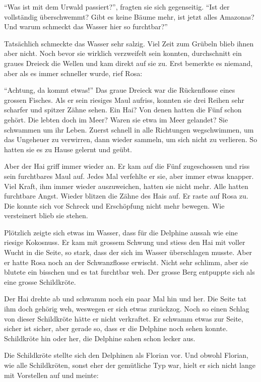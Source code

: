 \enquote{Was ist mit dem Urwald passiert?}, fragten sie sich gegenseitig. \enquote{Ist der vollständig überschwemmt? Gibt es keine Bäume mehr, ist jetzt alles Amazonas? Und warum schmeckt das Wasser hier so furchtbar?} 

Tatsächlich schmeckte das Wasser sehr salzig. Viel Zeit zum Grübeln blieb ihnen aber nicht. Noch bevor sie wirklich verzweifelt sein konnten, durchschnitt ein graues Dreieck die Wellen und kam direkt auf sie zu. Erst bemerkte es niemand, aber als es immer schneller wurde, rief Rosa:

\enquote{Achtung, da kommt etwas!} Das graue Dreieck war die Rückenflosse eines grossen Fisches. Als er sein riesiges Maul aufriss, konnten sie drei Reihen sehr scharfer und spitzer Zähne sehen. Ein Hai? Von denen hatten die Fünf schon gehört. Die lebten doch im Meer? Waren sie etwa im Meer gelandet? Sie schwammen um ihr Leben. Zuerst schnell in alle Richtungen wegschwimmen, um das Ungeheuer zu verwirren, dann wieder sammeln, um sich nicht zu verlieren. So hatten sie es zu Hause gelernt und geübt.

Aber der Hai griff immer wieder an. Er kam auf die Fünf zugeschossen und riss sein furchtbares Maul auf. Jedes Mal verfehlte er sie, aber immer etwas knapper. Viel Kraft, ihm immer wieder auszuweichen, hatten sie nicht mehr. Alle hatten furchtbare Angst. Wieder blitzen die Zähne des Hais auf. Er raste auf Rosa zu. Die konnte sich vor Schreck und Erschöpfung nicht mehr bewegen. Wie versteinert blieb sie stehen. 

Plötzlich zeigte sich etwas im Wasser, dass für die Delphine aussah wie eine riesige Kokosnuss. Er kam mit grossem Schwung und stiess den Hai mit voller Wucht in die Seite, so stark, dass der sich im Wasser überschlagen musste.  Aber er hatte Rosa noch an der Schwanzflosse erwischt. Nicht sehr schlimm, aber sie blutete ein bisschen und es tat furchtbar weh. Der grosse Berg entpuppte sich als eine grosse Schildkröte. 

Der Hai drehte ab und schwamm noch ein paar Mal hin und her. Die Seite tat ihm doch gehörig weh, weswegen er sich etwas zurückzog. Noch so einen Schlag von dieser Schildkröte hätte er nicht verkraftet. Er schwamm etwas zur Seite, sicher ist sicher, aber gerade so, dass er die Delphine noch sehen konnte. Schildkröte hin oder her, die Delphine sahen schon lecker aus.

Die Schildkröte stellte sich den Delphinen als Florian vor. Und obwohl Florian, wie alle Schildkröten, sonst eher der gemütliche Typ war, hielt er sich nicht lange mit Vorstellen auf und meinte: 

